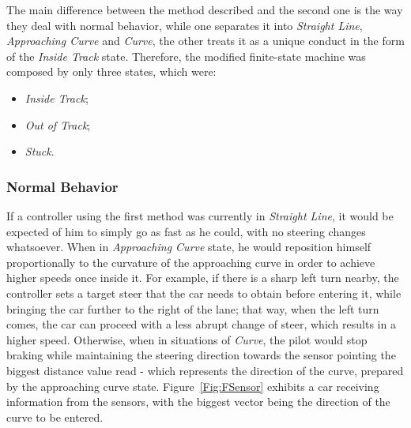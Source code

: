 	The main difference between the method described and the second one is the way they deal with normal behavior, while one separates it into \emph{Straight Line}, \emph{Approaching Curve} and \emph{Curve}, the other treats it as a unique conduct in the form of the \emph{Inside Track} state. Therefore, the modified finite-state machine was composed by only three states, which were:
	
	\begin{itemize}
		
		\item \emph{Inside Track};
		
		\item \emph{Out of Track};
		
		\item \emph{Stuck}.
		
	\end{itemize}
	
\subsubsection{Normal Behavior}
	
	If a controller using the first method was currently in \emph{Straight Line}, it would be expected of him to simply go as fast as he could, with no steering changes whatsoever. When in \emph{Approaching Curve} state, he would reposition himself proportionally to the curvature of the approaching curve in order to achieve higher speeds once inside it. For example, if there is a sharp left turn nearby, the controller sets a target steer that the car needs to obtain before entering it, while bringing the car further to the right of the lane; that way, when the left turn comes, the car can proceed with a less abrupt change of steer, which results in a higher speed. Otherwise, when in situations of \emph{Curve}, the pilot would stop braking while maintaining the steering direction towards the sensor pointing the biggest distance value read - which represents the direction of the curve, prepared by the approaching curve state. Figure~\ref{Fig:FSensor} exhibits a car receiving information from the sensors, with the biggest vector being the direction of the curve to be entered.
	
